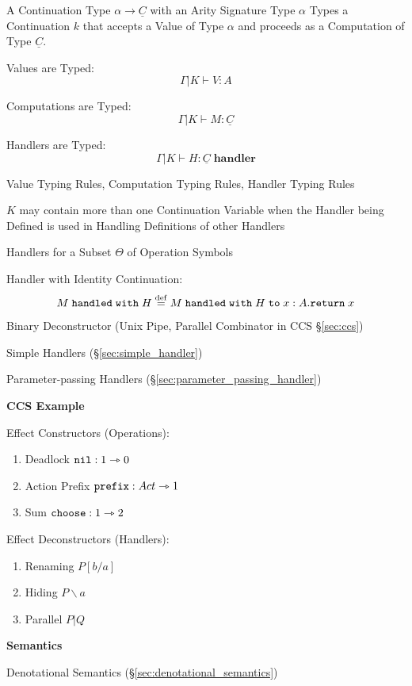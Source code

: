 A Continuation Type $\alpha \rightarrow \underline{C}$ with an Arity
Signature Type $\alpha$ Types a Continuation $k$ that accepts a Value
of Type $\alpha$ and proceeds as a Computation of Type
$\underline{C}$.

Values are Typed:
\[
  \Gamma | K \vdash V:A
\]

Computations are Typed:
\[
  \Gamma | K \vdash M : \underline{C}
\]

Handlers are Typed:
\[
  \Gamma | K \vdash H : \underline{C} \;\mathbf{handler}
\]

Value Typing Rules, Computation Typing Rules, Handler Typing Rules

$K$ may contain more than one Continuation Variable when the Handler
being Defined is used in Handling Definitions of other Handlers

Handlers for a Subset $\Theta$ of Operation Symbols %

Handler with Identity Continuation:
\[
  M \;\mathtt{handled\;with}\; H
    \stackrel{\mathrm{def}}= M \;\mathtt{handled\;with}\; H \;\mathtt{to}\;
      x:A.\mathtt{return}\; x
\]

Binary Deconstructor (Unix Pipe, Parallel Combinator in CCS
\S\ref{sec:ccs}) %

Simple Handlers (\S\ref{sec:simple_handler})

Parameter-passing Handlers (\S\ref{sec:parameter_passing_handler})


\textbf{CCS Example}

Effect Constructors (Operations):
\begin{enumerate}
  \item Deadlock $\mathtt{nil} : 1 \rightarrowtriangle 0$
  \item Action Prefix $\mathtt{prefix} : Act \rightarrowtriangle 1$
  \item Sum $\mathtt{choose} : 1 \rightarrowtriangle 2$
\end{enumerate}

Effect Deconstructors (Handlers):
\begin{enumerate}
  \item Renaming $P[b/a]$
  \item Hiding $P \backslash a$
  \item Parallel $P | Q$
\end{enumerate}


\asterism


\textbf{Semantics}

Denotational Semantics (\S\ref{sec:denotational_semantics})

